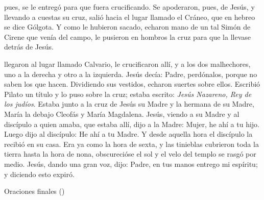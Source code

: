 \documentclass[10pt,oneside]{book}
\begin{document}
\begin{center}
      
\end{center}

 pues, se le entregó para que fuera crucificando. Se apoderaron, pues, de Jesús, y llevando a cuestas su cruz, 
salió hacia el lugar llamado el Cráneo, que en hebreo se dice Gólgota. Y como le hubieron sacado, echaron mano de un tal Simón de Cirene que venía del campo, 
le pusieron en hombros la cruz para que la llevase detrás de Jesús.

\begin{center}
      
\end{center}

llegaron al lugar llamado Calvario, le crucificaron allí, y a los dos malhechores, uno a la derecha y otro a la izquierda. 
Jesús decía: Padre, perdónalos, porque no saben los que hacen. Dividiendo sus vestidos, echaron suertes sobre ellos. Escribió Pilato un título y lo puso sobre la cruz;
estaba escrito: \textit{Jesús Nazareno, Rey de los judíos}. Estaba junto a la cruz de Jesús su Madre y la hermana de su Madre, María la debajo Cleofás y María Magdalena.
Jesús, viendo a su Madre y al discípulo a quien amaba, que estaba allí, dijo a la Madre: Mujer, he ahí a tu hijo. Luego dijo al discípulo: He ahí a tu Madre.
Y desde aquella hora el discípulo la recibió en su casa. Era ya como la hora de sexta, y las tinieblas cubrieron toda la tierra hasta la hora de nona,
obscurecióse el sol y el velo del templo se rasgó por medio. Jesús, dando una gran voz, dijo: Padre, en tus manos entrego mi espíritu; y diciendo esto expiró.

\begin{center}
      {}
      Oraciones finales ()
\end{center}
\end{document}
